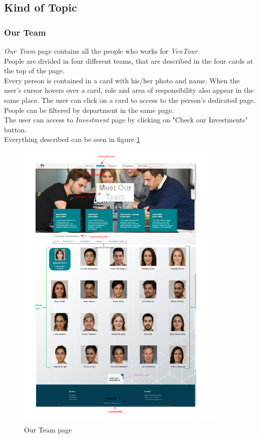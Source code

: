 \documentclass[../../DD.tex]{subfiles}
\begin{document}
\newpage
\subsection{Kind of Topic}
	\subsubsection{Our Team}
		\textit{Our Team} page contains all the people who works for \textit{VenTour}.\\
        People are divided in four different teams, that are described in the four cards at the top of the page.\\
        Every person is contained in a card with his/her photo and name. When the user's cursor hovers over a card, role and area of responsibility also appear in the same place. The user can click on a card to access to the person's dedicated page.\\
        People can be filtered by department in the same page.\\
        The user can access to \textit{Investment} page by clicking on "Check our Investments" button.\\
        Everything described can be seen in figure \ref{fig: Our_team_screen}
        \newline

\begin{figure}[!htb]
      \centering
      \includegraphics[width=0.9\textwidth]{Images/screenshots/Our Team_screen.pdf}
      \caption{Our Team page}
      \label{fig: Our_team_screen}
  \end{figure}
\end{document}
